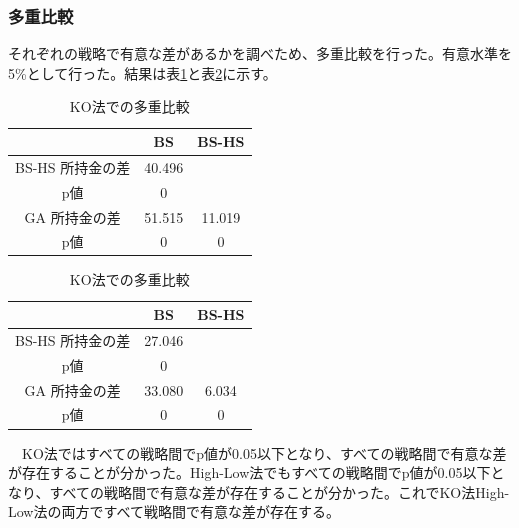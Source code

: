 \subsubsection{多重比較}
それぞれの戦略で有意な差があるかを調べため、多重比較を行った。有意水準を5\%として行った。結果は表\ref{multiKO}と表\ref{multiHigh-Low}に示す。
\begin{table}[H]
 \caption{KO法での多重比較\label{multiKO}}
 \begin{center}
  \begin{tabular}{|c|c|c|}
  \hline  & BS & BS-HS  \\
  \hline  BS-HS 所持金の差 & 40.496 & \\
	               p値 & 0 & \\
  \hline GA 所持金の差　& 51.515 & 11.019\\
                p値 & 0 & 0\\
  \hline
  \end{tabular}
 \end{center}
\end{table}
\begin{table}[H]
 \caption{KO法での多重比較\label{multiHigh-Low}}
 \begin{center}
  \begin{tabular}{|c|c|c|}
  \hline  & BS & BS-HS  \\
  \hline  BS-HS 所持金の差 & 27.046 & \\
	               p値 & 0 & \\
  \hline GA 所持金の差　& 33.080 & 6.034\\
                p値 & 0 & 0\\
  \hline
  \end{tabular}
 \end{center}
\end{table}
　KO法ではすべての戦略間でp値が0.05以下となり、すべての戦略間で有意な差が存在することが分かった。High-Low法でもすべての戦略間でp値が0.05以下となり、すべての戦略間で有意な差が存在することが分かった。これでKO法High-Low法の両方ですべて戦略間で有意な差が存在する。
